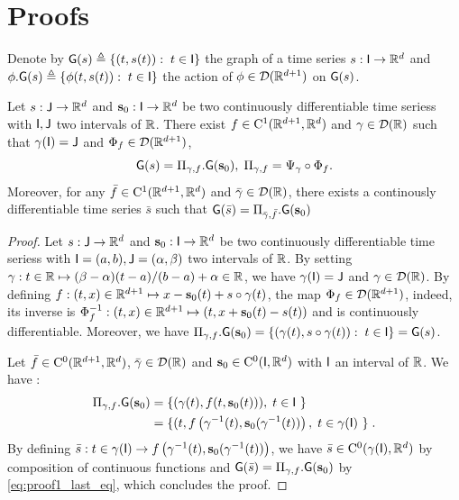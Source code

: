 \section{Proofs}
\label{appendix:proofs}
Denote by $\mathsf{G}(s)\triangleq \{ (t,s(t)): \; t\in \mathsf{I} \} $ the graph of a time series $s: \mathsf{I} \to \mathbb{R}^d$ and $ \phi.\mathsf{G}(s)\triangleq\{ \phi(t,s(t)): \; t\in \mathsf{I}\} $ the action of  $\phi\in \mathcal{D}(\mathbb{R}^{d+1}) $ on $\mathsf{G}(s)$.
\begin{theorem}
    \label{theorem:representation_proof}
Let $s:  \mathsf{J} \to \mathbb{R}^d  $ and $\mathbf{s}_0: \mathsf{I}\to \mathbb{R}^d $ be two continuously differentiable time seriess with $\mathsf{I},\mathsf{J}$ two intervals of $\mathbb{R}$.
 There exist $f\in \mathrm{C}^1(\mathbb{R}^{d+1},\mathbb{R}^d)$ and $\gamma\in  \mathcal{D}(\mathbb{R}) $ such that $\gamma(\mathsf{I})=\mathsf{J} $ and $\Phi_f\in \mathcal{D}(\mathbb{R}^{d+1})$,
 \begin{equation}%
    \msg(s)= \Pi_{\gamma,f}.\msg(\mathbf{s}_0),\eqsp \Pi_{\gamma,f}=\Psi_\gamma\circ\Phi_f.
 \end{equation}
 Moreover, for any $\bar{f}\in \mathrm{C}^1(\mathbb{R}^{d+1},\mathbb{R}^d)$ and $\bar{\gamma}\in  \mathcal{D}(\mathbb{R}) $, there exists a continously differentiable time series $\bar{s}$ such that 
 $\mathsf{G}(\bar{s})= \Pi_{\bar{\gamma},\bar{f}}.\mathsf{G}(\mathbf{s}_0)$
\end{theorem}
\begin{proof}
  Let $s:  \mathsf{J} \to \mathbb{R}^d  $ and $\mathbf{s}_0: \mathsf{I}\to \mathbb{R}^d $ be two continuously differentiable time seriess with $\mathsf{I}=(a,b),\mathsf{J}=(\alpha,\beta)$ two intervals of $\mathbb{R}$.
  By setting $\gamma: t\in \mathbb{R} \mapsto (\beta-\alpha)(t-a)/(b-a)+\alpha\in \mathbb{R} $, we have $ \gamma(\mathsf{I})=\mathsf{J}$ and $\gamma \in \mathcal{D}(\mathbb{R}) $.
   By defining $f:(t,x)\in\mathbb{R}^{d+1}\mapsto x-\mathbf{s}_0(t)+s\circ \gamma(t) $, the map $\Phi_f\in \mathcal{D}(\mathbb{R}^{d+1})$,
    indeed, its inverse is $\Phi_f^{-1}:(t,x)\in\mathbb{R}^{d+1}\mapsto (t,x+\mathbf{s}_0(t)-s(t)) $ and is continuously differentiable.
     Moreover, we have $\Pi_{\gamma,f}.\mathsf{G}(\mathbf{s}_0)=\{(\gamma(t),s\circ \gamma(t)):\; t\in\mathsf{I} \}=\mathsf{G}(s) $.

    

    Let $\bar{f}\in \mathrm{C}^0(\mathbb{R}^{d+1},\mathbb{R}^d)$, $\bar{\gamma}\in  \mathcal{D}(\mathbb{R}) $ and $\mathbf{s}_0\in \mathrm{C}^0(\mathsf{I},\mathbb{R}^d)$ with $\mathsf{I}$ an interval of $\mathbb{R}$.
    We have :
    \begin{align}
      \Pi_{\gamma,f}.\msg(\mathbf{s}_0)&=\{(\gamma(t),f(t,\mathbf{s}_0(t))),\eqsp t\in \msi \} \\
      &\label{eq:proof1_last_eq}=\{(t,f\left(\gamma^{-1}(t),\mathbf{s}_0(\gamma^{-1}(t))\right),\eqsp t\in \gamma(\msi) \} \eqsp .
    \end{align}
    By defining $\bar{s}:t\in \gamma(\mathsf{I})\to f\left(\gamma^{-1}(t),\mathbf{s}_0(\gamma^{-1}(t))\right) $, we have $\bar{s}\in \mathrm{C}^0(\gamma(\mathsf{I}), \mathbb{R}^d) $ by composition of continuous functions
    and $ \mathsf{G}(\bar{s})= \Pi_{\gamma,f}.\mathsf{G}(\mathbf{s}_0)$ by \eqref{eq:proof1_last_eq}, which concludes the proof.
\end{proof}
